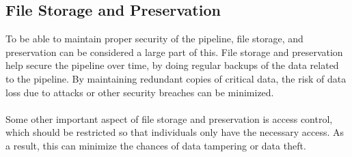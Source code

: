 \subsection{File Storage and Preservation}
To be able to maintain proper security of the pipeline, file storage, and preservation can be considered a large part of this. File storage and preservation help secure the pipeline over time, by doing regular backups of the data related to the pipeline. By maintaining redundant copies of critical data, the risk of data loss due to attacks or other security breaches can be minimized. 
\\~\\
Some other important aspect of file storage and preservation is access control, which should be restricted so that individuals only have the necessary access. As a result, this can minimize the chances of data tampering or data theft.

